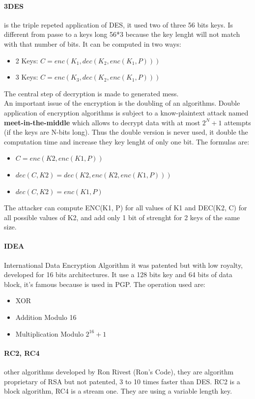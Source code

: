 \documentclass[12pt]{article}
\begin{document}
\paragraph{3DES} is the triple repeted application of DES, it used two of three 56 bits keys. Is different from passe to a keys long 56*3 because the key lenght will not match with that number of bits. It can be computed in two ways:
\begin{itemize}
  \item 2 Keys: $C = enc(K_1, dec(K_2, enc(K_1, P)))$
  \item 3 Keys: $C = enc(K_3, dec(K_2, enc(K_1, P)))$
\end{itemize}
The central step of decryption is made to generated mess.\\
An important issue of the encryption is the doubling of an algorithms. Double application of encryption algorithms is subject to a know-plaintext attack named \textbf{meet-in-the-middle} which allows to decrypt data with at most $2^N+1$ attempts (if the keys are N-bits long). Thus the double version is never used, it double the computation time and increase they key lenght of only one bit. The formulas are:
\begin{itemize}
  \item [] $C = enc(K2, enc(K1, P))$
  \item [] $dec(C, K2) = dec(K2, enc(K2, enc(K1, P)))$
  \item [] $dec(C, K2) = enc(K1, P)$
\end{itemize}
The attacker can compute ENC(K1, P) for all values of K1 and DEC(K2, C) for all possible values of K2, and add only 1 bit of strenght for 2 keys of the same size.

\paragraph{IDEA} International Data Encryption Algorithm it was patented but with low royalty, developed for 16 bits architectures. It use a 128 bits key and 64 bits of data block, it's famous because is used in PGP. The operation used are:
\begin{itemize}
  \item XOR
  \item Addition Modulo 16
  \item Multiplication Modulo $2^{16}+1$
\end{itemize}

\paragraph{RC2, RC4} other algorithms developed by Ron Rivest (Ron's Code), they are algorithm proprietary of RSA but not patented, 3 to 10 times faster than DES. RC2 is a block algorithm, RC4 is a stream one. They are using a variable length key.
\end{document}
